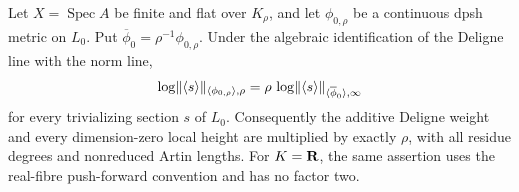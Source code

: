 \begin{lemma}
\label{lem:zero-anchor-r3}
Let $X=\operatorname{Spec}A$ be finite and flat over $K_\rho$, and let
$\phi_{0,\rho}$ be a continuous dpsh metric on $L_0$.  Put
$\overline\phi_0=\rho^{-1}\phi_{0,\rho}$.  Under the algebraic
identification of the Deligne line with the norm line,
\begin{equation}
 \log\lVert\langle s\rangle\rVert_{\langle\phi_{0,\rho}\rangle,\rho}
 =\rho\,
 \log\lVert\langle s\rangle\rVert_{\langle\overline\phi_0\rangle,\infty}
\label{eq:zero-metric-r3}
\end{equation}
for every trivializing section $s$ of $L_0$.  Consequently the additive
Deligne weight and every dimension-zero local height are multiplied by
exactly $\rho$, with all residue degrees and nonreduced Artin lengths.
For $K=\mathbf R$, the same assertion uses the real-fibre push-forward convention
and has no factor two.
\end{lemma}

